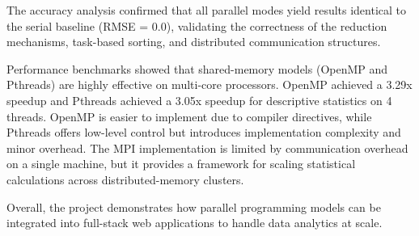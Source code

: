 \documentclass[12pt,a4paper]{article}
\begin{document}
The accuracy analysis confirmed that all parallel modes yield results identical to the serial baseline (RMSE = $0.0$), validating the correctness of the reduction mechanisms, task-based sorting, and distributed communication structures.

Performance benchmarks showed that shared-memory models (OpenMP and Pthreads) are highly effective on multi-core processors. OpenMP achieved a 3.29x speedup and Pthreads achieved a 3.05x speedup for descriptive statistics on 4 threads. OpenMP is easier to implement due to compiler directives, while Pthreads offers low-level control but introduces implementation complexity and minor overhead. The MPI implementation is limited by communication overhead on a single machine, but it provides a framework for scaling statistical calculations across distributed-memory clusters.

Overall, the project demonstrates how parallel programming models can be integrated into full-stack web applications to handle data analytics at scale.
\end{document}
